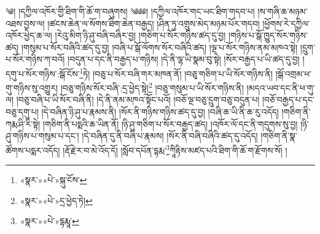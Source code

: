 ༄། །དཀྱིལ་འཁོར་གྱི་ཐིག་གི་ཆོ་ག་བཞུགས། ༄༅༅། །དཀྱིལ་འཁོར་གང་ཡང་ཐིག་གདབ་པ། །ས་གཞི་ཆ་མཉམ་འཐས་བྱས་ལ། །ཚངས་ཆེན་ལ་སོགས་ཐིག་ཆེན་བརྒྱད། །ཤིན་ཏུ་འགྲུས་མེད་མཉམ་པོར་གདབ། །ཕྱོགས་རེ་དཀྱིལ་འཁོར་ཕྱེད་ཆ་ལ། །རེའུ་མིག་ཉི་ཤུ་བཞི་བཞིར་བྱ། །གཅིག་པ་སོར་གཉིས་ཚད་དུ་བྱ། །གཉིས་པ་སྒོ་ཁྱུད་སོར་གཉིས་ཚད། །གསུམ་པ་སོར་བཞིའི་ཚད་དུ་བྱ། །བཞི་པ་སྒོ་ལོགས་སོར་བཞིའི་ཚད། །ལྔ་པ་སོར་གཉིས་ནམ་མཁའ་སྟེ། །དྲུག་པ་སོར་གཉིས་ཀ་བའོ། །བདུན་པ་དང་ནི་བརྒྱད་པ་གཉིས། །དེ་ནི་ལྷ་ཡི་སྣམ་བུ་སྟེ། །སོར་བརྒྱད་པ་ཡི་ཚད་དུ་བྱ། །དགུ་པ་སོར་གཉིས་:སྒོ་ངོས་\footnote{«སྣར་»«པེ་»སྐུ་ངོས་}ཏེ། །བཅུ་པ་སོར་བཞི་གར་མཁན་ནོ། །བཅུ་གཅིག་པ་ཡི་སོར་གཉིས་ནི། །སྒོ་འགྲམ་ཕ་གུ་གཉིས་སུ་འགྱུར། །བཅུ་གཉིས་སོར་བཞི་:དྲ་ཕྱེད་སྟེ།\footnote{«སྣར་»«པེ་»དྲ་ཕྱེད་ཏེ།} །བཅུ་གསུམ་པ་ཡི་སོར་གཉིས་ནི། །མདའ་ཡབ་དང་ནི་ཕ་གུ་ལ། །བཅུ་བཞི་པ་ཡི་སོར་བཞི་ནི། །དེ་ནི་ནམ་མཁའ་སྟོང་པའོ། །བཅོ་ལྔ་བཅུ་དྲུག་བཅུ་བདུན་པ། །བཅོ་བརྒྱད་པ་དང་བཅུ་དགུ་པ། །དེ་བཞིན་ཉི་ཤུ་པ་རྣམས་ནི། །སོར་ནི་གཉིས་གཉིས་ཚད་དུ་བྱ། །བཞི་ཆ་ཡི་ནི་ཆ་རུ་འདོད། །གཅིག་ནི་ཀརྨ་ཤི་རི་སྟེ། །གཅིག་ནི་པདྨའི་ཆ་ཡིན་ནོ། །ཉི་ཤུ་གཅིག་པ་སོར་བརྒྱད་ཚད། །འཁོར་ལོ་དང་ནི་གདུགས་སུ་བྱ། །ཉི་ཤུ་གཉིས་པ་གསུམ་པ་དང་། །དེ་བཞིན་དུ་ནི་བཞི་པ་རྣམས། །སོར་ནི་བཞི་བཞིའི་ཚད་དུ་འདོད། །གཅིག་ནི་སྣ་ཚོགས་པདྨར་འདོད། །རྡོ་རྗེ་ར་བ་མེ་འོད་དོ། །སློབ་དཔོན་དྷརྨ་\footnote{«སྣར་»«པེ་»དྷརྨཱ་}ཀཱིརྟིས་མཛད་པའི་ཐིག་གི་ཆོ་ག་རྫོགས་སོ། ། 